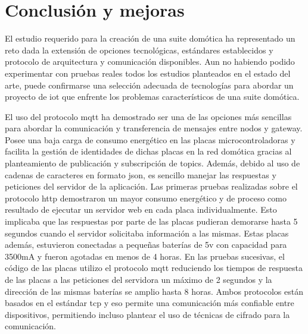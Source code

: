 \cleardoublepage

\chapter{Conclusión y mejoras}
\label{ch:Capitulo6}


El estudio requerido para la creación de una suite domótica ha representado un reto dada la extensión de opciones tecnológicas, estándares establecidos y protocolo de arquitectura y comunicación disponibles. Aun no habiendo podido experimentar con pruebas reales todos los estudios planteados en el estado del arte, puede confirmarse una selección adecuada de tecnologías para abordar un proyecto de \gls{iot} que enfrente los problemas característicos de una suite domótica.

\vspace{1cm}

El uso del protocolo \gls{mqtt} ha demostrado ser una de las opciones más sencillas para abordar la comunicación y transferencia de mensajes entre nodos y \gls{gateway}. Posee una baja carga de consumo energético en las placas microcontroladoras y facilita la gestión de identidades de dichas placas en la red domótica gracias al planteamiento de publicación y subscripción de topics. Además, debido al uso de cadenas de caracteres en formato \gls{json}, es sencillo manejar las respuestas y peticiones del servidor de la aplicación. Las primeras pruebas realizadas sobre el protocolo \gls{http} demostraron un mayor consumo energético y de proceso como resultado de ejecutar un servidor web en cada placa individualmente. Esto implicaba que las respuestas por parte de las placas pudieran demorarse hasta 5 segundos cuando el servidor solicitaba información a las mismas. Estas placas además, estuvieron conectadas a pequeñas baterías de 5v con capacidad para 3500mA y fueron agotadas en menos de 4 horas. En las pruebas sucesivas, el código de las placas utilizo el protocolo \gls{mqtt} reduciendo los tiempos de respuesta de las placas a las peticiones del servidora un máximo de 2 segundos y la dirección de las mismas baterías se amplio hasta 8 horas. Ambos protocolos están basados en el estándar \gls{tcp} y eso permite una comunicación más confiable entre dispositivos, permitiendo incluso plantear el uso de técnicas de cifrado para la comunicación.

\vspace{1cm}

